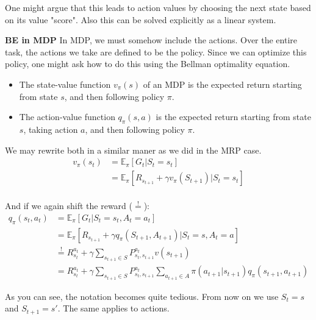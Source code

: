 \documentclass[main]{subfiles}
\begin{document}
One might argue that this leads to action values by choosing the next state based on its value "score". Also this can be solved explicitly as a linear system.


\textbf{BE in MDP}
In MDP, we must somehow include the actions. Over the entire task, the actions we take are defined to be the policy. Since we can optimize this policy, one might ask how to do this using the Bellman optimality equation.

\begin{itemize}
    \item The state-value function $v_\pi(s)$ of an MDP is the expected return starting from state $s$, and then following policy $\pi$.
    \item The action-value function $q_\pi(s,a)$ is the expected return starting from state $s$, taking action $a$, and then following policy $\pi$.
\end{itemize}

We may rewrite both in a similar maner as we did in the MRP case.
\begin{align}
    v_\pi(s_t) &= \mathbb{E}_\pi[G_t|S_t = s_t] \\
    &= \mathbb{E}_\pi[R_{s_{t+1}} + \gamma v_\pi(S_{t+1})|S_t = s_t] \\
\end{align}

And if we again shift the reward ($\overset{!}{=}$):
\begin{align}
    q_\pi(s_t,a_t)& = \mathbb{E}_\pi[G_t|S_t = s_t, A_t =a_t] \\
    &= \mathbb{E}_\pi[R_{s_{t+1}} + \gamma q_\pi(S_{t+1}, A_{t+1})|S_t = s, A_t=a] \\
    & \overset{!}{=} R_{s_t}^{a_t} + \gamma \sum_{s_{t+1} \in S} P_{s_t,s_{t+1}}^{a_t} v(s_{t+1}) \\
    & = R_{s_t}^{a_t} + \gamma \sum_{s_{t+1} \in S} P_{s_t,s_{t+1}}^{a_t} \sum_{a_{t+1} \in A} \pi(a_{t+1}|s_{t+1}) q_\pi(s_{t+1}, a_{t+1})
\end{align}

As you can see, the notation becomes quite tedious. From now on we use $S_t = s$ and $S_{t+1} = s'$. The same applies to actions.
\end{document}
